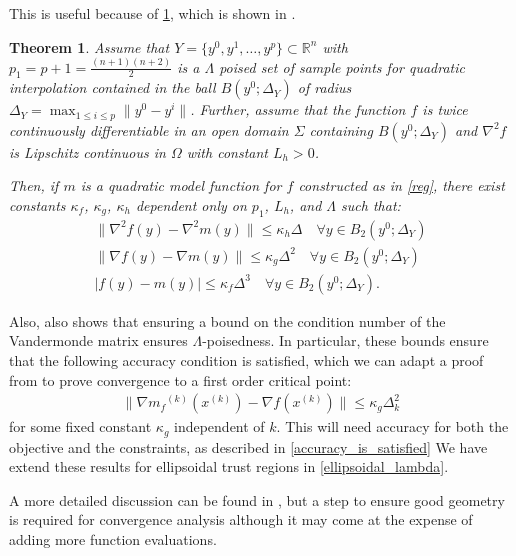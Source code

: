 \documentclass{article}
\newtheorem{theorem}{Theorem}[section]
\theoremstyle{case}
\newcommand{\dk}{\Delta_k}
\newcommand{\gradf}{\nabla f}
\newcommand{\mfk}{{{m}_f}^{(k)}}
\newcommand{\Rn}{\mathbb R^n}
\newcommand{\xk}{{x^{(k)}}}
\begin{document}
This is useful because of \cref{quadratic_errors}, which is shown in \cite{DUMMY:intro_book}.

\begin{theorem}
\label{quadratic_errors}
Assume that $Y = \{y^0, y^1, \ldots, y^p\} \subset \Rn$ with $p_1 = p+1= \frac{(n+1)(n+2)}{2}$ is a $\Lambda$
poised set of sample points for quadratic interpolation contained in the ball $B(y^0; \Delta_Y)$ of radius $\Delta_Y = \max_{1\le i \le p} \|y^0 - y^i\|$.
Further, assume that the function $f$ is twice continuously differentiable in an open domain $\Sigma$ containing $B(y^0; \Delta_Y)$ and $\nabla^2 f$
is Lipschitz continuous in $\Omega$ with constant $L_h > 0$.

Then, if $m$ is a quadratic model function for $f$ constructed as in \cref{reg}, there exist constants $\kappa_f$, $\kappa_g$, $\kappa_h$ dependent only on $p_1$, $L_h$, and $\Lambda$ such that:
\begin{align}
\|\nabla^2 f(y) - \nabla^2 m(y)\| \le \kappa_{h} \Delta \quad \forall y \in B_2(y^0; \Delta_Y) \label{error_in_hessian}\\
\|\gradf(y) - \nabla m(y)\| \le \kappa_{g} \Delta^2 \quad \forall y \in B_2(y^0; \Delta_Y) \label{error_in_gradient} \\
|f(y) - m(y) | \le \kappa_{f} \Delta^3 \quad \forall y \in B_2(y^0; \Delta_Y). \label{error_in_function} 
\end{align}
\end{theorem}


Also, \cite{DUMMY:intro_book} also shows that ensuring a bound on the condition number of the Vandermonde matrix ensures $\Lambda$-poisedness.
In particular, these bounds ensure that the following accuracy condition is satisfied, which we can adapt a proof from \cite{Conejo:2013:GCT:2620806.2621814} to prove convergence to a first order critical point: 
\begin{align}
\label{accuracy}
\|\nabla \mfk(\xk) - \gradf(\xk) \| \le \kappa_g \dk^2
\end{align}
for some fixed constant $\kappa_g$ independent of $k$.
This will need accuracy for both the objective and the constraints, as described in \cref{accuracy_is_satisfied}
We have extend these results for ellipsoidal trust regions in \cref{ellipsoidal_lambda}.
 
A more detailed discussion can be found in \cite{doi:10.1080/10556780802409296}, but a step to ensure good geometry is required for convergence analysis although it may come at the expense of adding more function evaluations.
\end{document}
